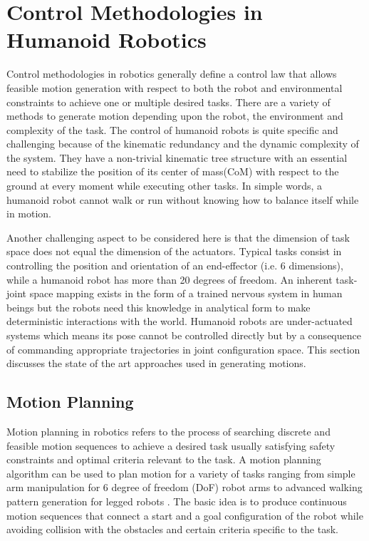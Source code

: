 \section{Control Methodologies in Humanoid Robotics}
\label{sec:control_methods}
Control methodologies in robotics generally define a control law that allows feasible motion generation with respect to both the robot and environmental constraints to achieve one or multiple desired tasks. There are a variety of methods to generate motion depending upon the robot, the environment and complexity of the task. The control of humanoid robots is quite specific and challenging because of the kinematic redundancy and the dynamic complexity of the system. They have a non-trivial kinematic tree structure with an essential need to stabilize the position of its center of mass(CoM) with respect to the ground at every moment while executing other tasks. In simple words, a humanoid robot cannot walk or run without knowing how to balance itself while in motion. 

Another challenging aspect to be considered here is that the dimension of task space does not equal the dimension of the actuators. Typical tasks consist in controlling the position and orientation of an end-effector (i.e. 6 dimensions), while a humanoid robot has more than 20 degrees of freedom. An inherent task-joint space mapping exists in the form of a trained nervous system in human beings but the robots need this knowledge in analytical form to make deterministic interactions with the world. Humanoid robots are under-actuated systems which means its pose cannot be controlled directly but by a consequence of commanding appropriate trajectories in joint configuration space. This section discusses the state of the art 
approaches used in generating motions.

\subsection{Motion Planning}
Motion planning in robotics refers to the process of searching discrete and feasible motion sequences to achieve a desired task usually satisfying safety constraints and optimal criteria relevant to the task. A motion planning algorithm can be used to plan motion for a variety of tasks ranging from simple arm manipulation for 6 degree of freedom (DoF) robot arms \cite{donald1987search,lozano1987simple} to advanced walking pattern generation for legged robots \cite{kajita2003biped,huang2001planning,harada2006analytical}. The basic idea is to produce continuous motion sequences that connect a start and a goal configuration of the robot while avoiding collision with the obstacles and certain criteria specific to the task. 

